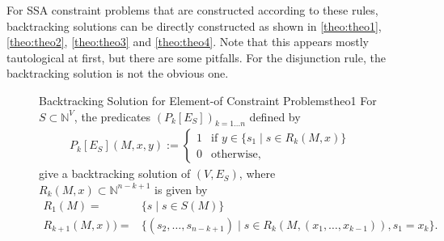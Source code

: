     For SSA constraint problems that are constructed according to these rules,
    backtracking solutions can be directly constructed as shown in
    \autoref{theo:theo1}, \autoref{theo:theo2}, \autoref{theo:theo3} and
    \autoref{theo:theo4}.
    Note that this appears mostly tautological at first, but there are some
    pitfalls.
    For the disjunction rule, the backtracking solution is not the obvious one.

\begin{figure}[p]
    \begin{theorem}{Backtracking Solution for Element-of Constraint Problems}{theo1}
        For $S\subset\mathbb N^V$, the predicates $(P_k[E_S])_{k=1\dots n}$
        defined by
        \begin{align*}
            P_k[E_S](M,x,y):=\left\{
                \begin{array}{ll}
                    1&\text{if }y\in \{s_1\mid s\in R_k(M,x)\}\\
                    0&\text{otherwise},
                \end{array}\right.
        \end{align*}
        give a backtracking solution of $(V,E_S)$, where
        $R_k(M,x)\subset\mathbb N^{n-k+1}$ is given by
        \begin{align*}
            R_1(M)={}&\{s\mid s\in S(M)\}\\
            R_{k+1}(M,x))={}&\{(s_2,\dots,s_{n-k+1})\mid s\in R_k(M,(x_1,\dots,x_{k-1})), s_1=x_k\}.
        \end{align*}
        \tcblower

\end{theorem}
\end{figure}
